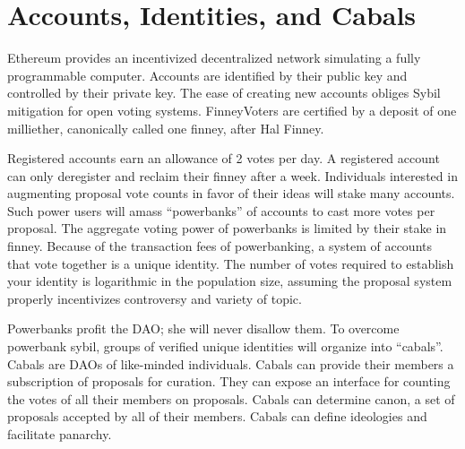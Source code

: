 \documentclass{article}
\begin{document}
\section{Accounts, Identities, and Cabals}
Ethereum provides an incentivized decentralized network simulating a fully programmable computer.
Accounts are identified by their public key and controlled by their private key.
The ease of creating new accounts obliges Sybil mitigation for open voting systems.
FinneyVoters are certified by a deposit of one milliether, canonically called one finney, after Hal Finney.
\par
Registered accounts earn an allowance of 2 votes per day.
A registered account can only deregister and reclaim their finney after a week.
Individuals interested in augmenting proposal vote counts in favor of their ideas will stake many accounts.
Such power users will amass ``powerbanks'' of accounts to cast more votes per proposal.
The aggregate voting power of powerbanks is limited by their stake in finney.
Because of the transaction fees of powerbanking, a system of accounts that vote together is a unique identity.
The number of votes required to establish your identity is logarithmic in the population size, assuming the proposal system properly incentivizes controversy and variety of topic.
\par
Powerbanks profit the DAO; she will never disallow them.
To overcome powerbank sybil, groups of verified unique identities will organize into ``cabals''.
Cabals are DAOs of like-minded individuals.
Cabals can provide their members a subscription of proposals for curation.
They can expose an interface for counting the votes of all their members on proposals.
Cabals can determine canon, a set of proposals accepted by all of their members.
Cabals can define ideologies and facilitate panarchy.
\end{document}
